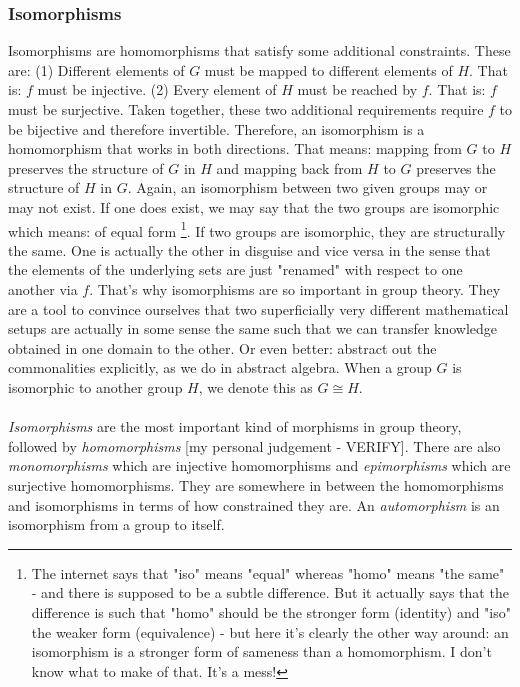 \subsubsection{Isomorphisms}
Isomorphisms are homomorphisms that satisfy some additional constraints. These are: (1) Different elements of $G$ must be mapped to different elements of $H$. That is: $f$ must be injective. (2) Every element of $H$ must be reached by $f$. That is: $f$ must be surjective. Taken together, these two additional requirements require $f$ to be bijective and therefore invertible. Therefore, an isomorphism is a homomorphism that works in both directions. That means: mapping from $G$ to $H$ preserves the structure of $G$ in $H$ and mapping back from $H$ to $G$ preserves the structure of $H$ in $G$. Again, an isomorphism between two given groups may or may not exist. If one does exist, we may say that the two groups are isomorphic which means: of equal form \footnote{The internet says that "iso" means "equal" whereas "homo" means "the same" - and there is supposed to be a subtle difference. But it actually says that the difference is such that "homo" should be the stronger form (identity) and "iso" the weaker form (equivalence) - but here it's clearly the other way around: an isomorphism is a stronger form of sameness than a homomorphism. I don't know what to make of that. It's a mess!}. If two groups are isomorphic, they are structurally the same. One is actually the other in disguise and vice versa in the sense that the elements of the underlying sets are just "renamed" with respect to one another via $f$. That's why isomorphisms are so important in group theory. They are a tool to convince ourselves that two superficially very different mathematical setups are actually in some sense the same such that we can transfer knowledge obtained in one domain to the other. Or even better: abstract out the commonalities explicitly, as we do in abstract algebra. When a group $G$ is isomorphic to another group $H$, we denote this as $G \cong H$.


\paragraph{}
\emph{Isomorphisms} are the most important kind of morphisms in group theory, followed by \emph{homomorphisms} [my personal judgement - VERIFY]. There are also \emph{monomorphisms} which are injective homomorphisms and \emph{epimorphisms} which are surjective homomorphisms. They are somewhere in between the homomorphisms and isomorphisms in terms of how constrained they are. An \emph{automorphism} is an isomorphism from a group to itself.

